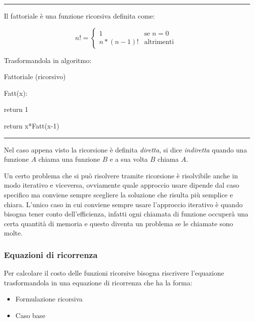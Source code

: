 \documentclass{article}
\begin{document}
\noindent\rule{\textwidth}{0.5pt}\newline

\noindent Il fattoriale è una funzione ricorsiva definita come:

\[
n! =
\begin{cases}
1 & \text{se } n=0 \\
n*(n-1)! & \text{altrimenti } 
\end{cases}
\]\newline

\noindent Trasformandola in algoritmo:

\begin{algorithm}[ht]
\caption{Fattoriale (ricorsivo)}
\begin{algorithmic}
\State Fatt(x):

     

        \State return 1

    \EndIf

\State return x*Fatt(x-1)

\end{algorithmic}
\end{algorithm}

\noindent\rule{\textwidth}{0.5pt}\newline

\noindent Nel caso appena visto la ricorsione è definita \textit{diretta}, si dice \textit{indiretta} quando una funzione $A$ chiama una funzione $B$ e a sua volta $B$ chiama $A$.\newline

\noindent Un certo problema che si può risolvere tramite ricorsione è risolvibile anche in modo iterativo e viceversa, ovviamente quale approccio usare dipende dal caso specifico ma conviene sempre scegliere la soluzione che risulta più semplice e chiara. L'unico caso in cui conviene sempre usare l'approccio iterativo è quando bisogna tener conto dell'efficienza, infatti ogni chiamata di funzione occuperà una certa quantità di memoria e questo diventa un problema se le chiamate sono molte.

\newpage

\subsubsection{Equazioni di ricorrenza}

Per calcolare il costo delle funzioni ricorsive bisogna riscrivere l'equazione trasformandola in una equazione di ricorrenza che ha la forma:
\begin{itemize}
    \item Formulazione ricorsiva
    \item Caso base
\end{itemize}
\end{document}
